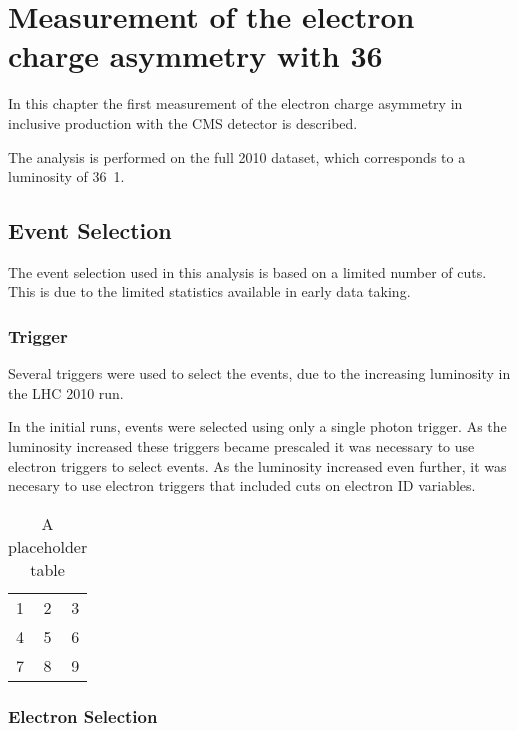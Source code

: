 \chapter{ 
Measurement of the electron charge asymmetry with \unit{36}{\invpb} }


In this chapter the first measurement of the electron charge asymmetry in
inclusive \inclusiveWe production with the \ac{CMS} detector is described.

The analysis is performed on the full 2010 dataset, which corresponds to a
luminosity of \unit{36.1}{\invpb}.


\section{Event Selection}

The event selection used in this analysis is based on a limited number of cuts.
This is due to the limited statistics available in early data taking.

\subsection{Trigger}

Several triggers were used to select the events, due to the increasing
luminosity in the \ac{LHC} 2010 run.

In the initial runs, events were selected using only a single photon trigger. 
As the luminosity increased these triggers became prescaled it was
necessary to use electron triggers to select events. 
As the luminosity increased even further, it was necesary to use electron
triggers that included cuts on electron ID variables.

\begin{table}[htb]
  \centering
  \begin{tabular}{| l c r |}
    \hline
    1 & 2 & 3 \\
    4 & 5 & 6 \\
    7 & 8 & 9 \\
  \hline
  \end{tabular}
  \caption{A placeholder table}
  \label{asym36:triggers}
\end{table}

\subsection{Electron Selection}

